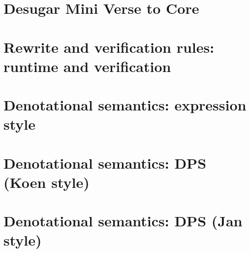 \documentclass[acmsmall,screen,review,9pt]{acmart}\settopmatter{}
\begin{document}

\clearpage \newpage
\section{Desugar Mini Verse to Core}



\clearpage \newpage
\section{Rewrite and verification rules: runtime and verification}



\clearpage \newpage
\section{Denotational semantics: expression style}



\clearpage \newpage
\section{Denotational semantics: DPS (Koen style)}



\clearpage \newpage
\section{Denotational semantics: DPS (Jan style)}

 
\end{document}
